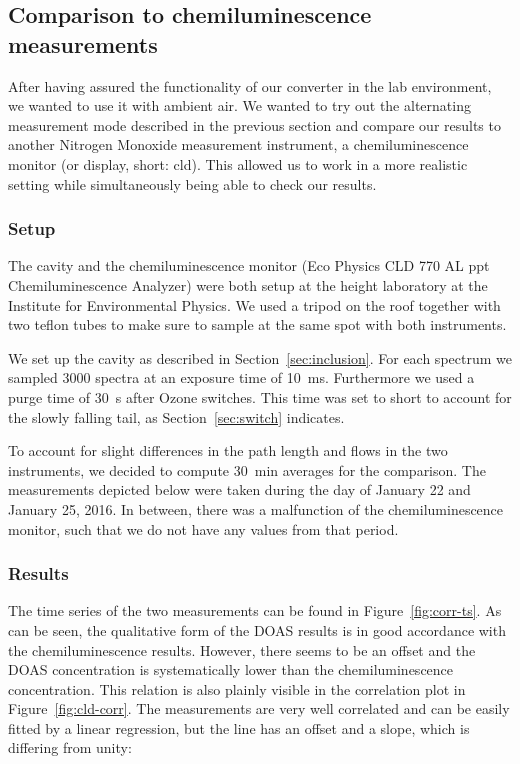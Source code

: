 \subsection{Comparison to chemiluminescence measurements}
\label{sec:cld}

After having assured the functionality of our converter in the lab
environment, we wanted to use it with ambient air. We wanted to try
out the alternating measurement mode described in the previous section
and compare our results to another Nitrogen Monoxide measurement
instrument, a chemiluminescence monitor (or display, short: cld). This
allowed us to  work in a more realistic setting while
simultaneously being able to check our results.

\subsubsection{Setup}
\label{sec:cld-setup}

The cavity and the chemiluminescence monitor (Eco Physics CLD 770 AL
ppt Chemiluminescence  Analyzer) were both setup at the height
laboratory at the Institute for Environmental Physics. We used a
tripod on the roof together with two teflon tubes to make sure to
sample at the same spot with both instruments.

We set up the cavity as described in Section~\ref{sec:inclusion}. For
each spectrum we sampled 3000 spectra at an exposure time of
\SI{10}{\milli\second}. Furthermore we used a purge time of
\SI{30}{\second} after Ozone switches. This time was set to short to
account for the slowly falling tail, as Section~\ref{sec:switch}
indicates.

To account for slight differences in the path length and flows in the
two instruments, we decided to compute \SI{30}{\minute} averages for
the comparison. The measurements depicted below were taken during the
day of January 22 and January 25, 2016. In between, there was a
malfunction of the chemiluminescence monitor, such that we do not have
any values from that period.

\subsubsection{Results}
\label{sec:cld-results}

The time series of the two measurements can be found in
Figure~\ref{fig:corr-ts}. As can be seen, the qualitative form of the
DOAS results is in good accordance with the chemiluminescence results.
However, there seems to be an offset and the DOAS concentration is
systematically lower than the chemiluminescence concentration. This
relation is also plainly visible in the correlation plot in
Figure~\ref{fig:cld-corr}. The measurements are very well correlated
and can be easily fitted by a linear regression, but the line has an
offset and a slope, which is differing from unity:

